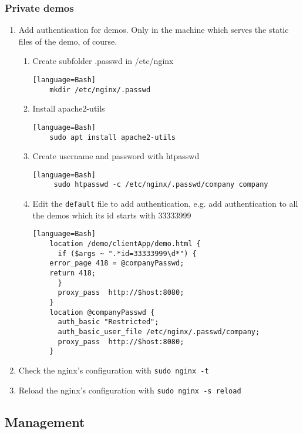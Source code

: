 \documentclass[a4paper,12pt]{article}
\begin{document}
\subsubsection{Private demos}
\begin{enumerate}
    \item Add authentication for demos. Only in the machine which serves the static files of the demo, of course.
    \begin{enumerate}
    \item Create subfolder .passwd in /etc/nginx
    \begin{verbatim}[language=Bash]
    mkdir /etc/nginx/.passwd
    \end{verbatim}
    \item Install apache2-utils
    \begin{verbatim}[language=Bash]
    sudo apt install apache2-utils
    \end{verbatim}
    \item Create username and password with htpasswd
    \begin{verbatim}[language=Bash]
     sudo htpasswd -c /etc/nginx/.passwd/company company
    \end{verbatim}
    \item Edit the {\tt default} file to add authentication, e.g. add authentication to all the demos which its id starts with 33333999
    \begin{verbatim}[language=Bash]
    location /demo/clientApp/demo.html {
      if ($args ~ ".*id=33333999\d*") {
	error_page 418 = @companyPasswd;
	return 418;
      }
      proxy_pass  http://$host:8080;
    }
    location @companyPasswd {
      auth_basic "Restricted";
      auth_basic_user_file /etc/nginx/.passwd/company;
      proxy_pass  http://$host:8080;
    }
    \end{verbatim}
    \end{enumerate}

    \item Check the nginx's configuration with {\tt sudo nginx -t}

    \item Reload the nginx's configuration with {\tt sudo nginx -s reload}
\end{enumerate}

\subsection{Management}
\end{document}
